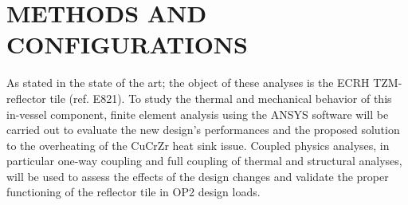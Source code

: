 \chapter{METHODS AND CONFIGURATIONS}
\normalsize{As stated in the state of the art; the object of these analyses is the \acrshort{ECRH} TZM-reflector tile (ref. E821). To study the thermal and mechanical behavior of this in-vessel component, finite element analysis using the ANSYS\textsuperscript{\textregistered} software will be carried out to evaluate the new design's performances and the proposed solution to the overheating of the CuCrZr heat sink issue. Coupled physics analyses, in particular one-way coupling and full coupling of thermal and structural analyses, will be used to assess the effects of the design changes and validate the proper functioning of the reflector tile in \acrshort{OP2} design loads.}





% 